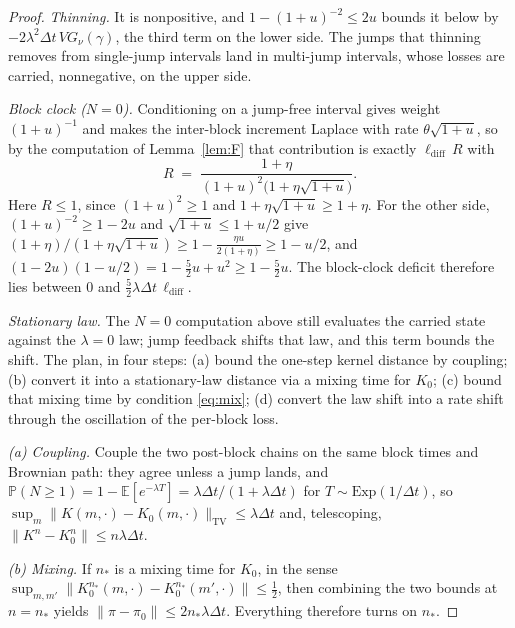 \documentclass[runningheads]{llncs}
\newcommand{\E}{\mathbb{E}}
\newcommand{\Prob}{\mathbb{P}}
\newcommand{\dt}{\Delta t}
\newcommand{\1}{\mathbf{1}}
\begin{document}
\begin{proof}
\emph{Thinning.} It is nonpositive, and $1-(1+u)^{-2}\le2u$ bounds it below by $-2\lambda^2\dt\,VG_\nu(\gamma)$, the third term on the lower side. The jumps that thinning removes from single-jump intervals land in multi-jump intervals, whose losses are carried, nonnegative, on the upper side.

\emph{Block clock ($N=0$).} Conditioning on a jump-free interval gives weight $(1+u)^{-1}$ and makes the inter-block increment Laplace with rate $\theta\sqrt{1+u}$, so by the computation of Lemma~\ref{lem:F} that contribution is exactly $\ell_{\mathrm{diff}}\,R$ with
\[
R \;=\; \frac{1+\eta}{(1+u)^2\big(1+\eta\sqrt{1+u}\big)}.
\]
Here $R\le1$, since $(1+u)^2\ge1$ and $1+\eta\sqrt{1+u}\ge1+\eta$. For the other side, $(1+u)^{-2}\ge1-2u$ and $\sqrt{1+u}\le1+u/2$ give $(1+\eta)/(1+\eta\sqrt{1+u})\ge1-\tfrac{\eta u}{2(1+\eta)}\ge1-u/2$, and $(1-2u)(1-u/2)=1-\tfrac52u+u^2\ge1-\tfrac52u$. The block-clock deficit therefore lies between $0$ and $\tfrac52\lambda\dt\,\ell_{\mathrm{diff}}$.

\emph{Stationary law.} The $N=0$ computation above still evaluates the carried state against the $\lambda=0$ law; jump feedback shifts that law, and this term bounds the shift. The plan, in four steps: (a) bound the one-step kernel distance by coupling; (b) convert it into a stationary-law distance via a mixing time for $K_0$; (c) bound that mixing time by condition \eqref{eq:mix}; (d) convert the law shift into a rate shift through the oscillation of the per-block loss.

\emph{(a) Coupling.} Couple the two post-block chains on the same block times and Brownian path: they agree unless a jump lands, and $\Prob(N\ge1)=1-\E[e^{-\lambda T}]=\lambda\dt/(1+\lambda\dt)$ for $T\sim\mathrm{Exp}(1/\dt)$, so $\sup_m\|K(m,\cdot)-K_0(m,\cdot)\|_{\mathrm{TV}}\le\lambda\dt$ and, telescoping, $\|K^n-K_0^n\|\le n\lambda\dt$.

\emph{(b) Mixing.} If $n_*$ is a mixing time for $K_0$, in the sense $\sup_{m,m'}\|K_0^{n_*}(m,\cdot)-K_0^{n_*}(m',\cdot)\|\le\tfrac12$, then combining the two bounds at $n=n_*$ yields $\|\pi-\pi_0\|\le2n_*\lambda\dt$. Everything therefore turns on $n_*$.


\end{proof}
\end{document}
